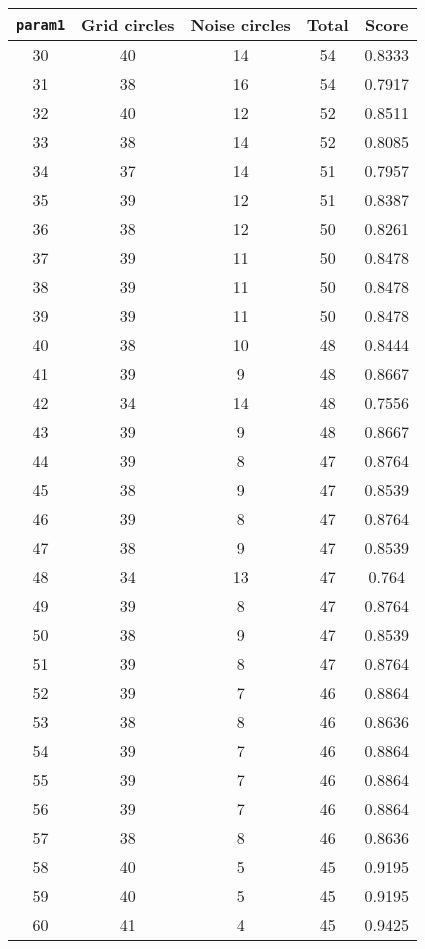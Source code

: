 \documentclass[letterpaper, 12pt]{article}
\begin{document}
\begin{longtable}{|c|c|c|c|c|}
\hline
\textbf{\texttt{param1}} & \textbf{Grid circles} & \textbf{Noise circles} & \textbf{Total} & \textbf{Score} \\
\hline
30 & 40 & 14 & 54 & 0.8333 \\
\hline
31 & 38 & 16 & 54 & 0.7917 \\
\hline
32 & 40 & 12 & 52 & 0.8511 \\
\hline
33 & 38 & 14 & 52 & 0.8085 \\
\hline
34 & 37 & 14 & 51 & 0.7957 \\
\hline
35 & 39 & 12 & 51 & 0.8387 \\
\hline
36 & 38 & 12 & 50 & 0.8261 \\
\hline
37 & 39 & 11 & 50 & 0.8478 \\
\hline
38 & 39 & 11 & 50 & 0.8478 \\
\hline
39 & 39 & 11 & 50 & 0.8478 \\
\hline
40 & 38 & 10 & 48 & 0.8444 \\
\hline
41 & 39 & 9 & 48 & 0.8667 \\
\hline
42 & 34 & 14 & 48 & 0.7556 \\
\hline
43 & 39 & 9 & 48 & 0.8667 \\
\hline
44 & 39 & 8 & 47 & 0.8764 \\
\hline
45 & 38 & 9 & 47 & 0.8539 \\
\hline
46 & 39 & 8 & 47 & 0.8764 \\
\hline
47 & 38 & 9 & 47 & 0.8539 \\
\hline
48 & 34 & 13 & 47 & 0.764 \\
\hline
49 & 39 & 8 & 47 & 0.8764 \\
\hline
50 & 38 & 9 & 47 & 0.8539 \\
\hline
51 & 39 & 8 & 47 & 0.8764 \\
\hline
52 & 39 & 7 & 46 & 0.8864 \\
\hline
53 & 38 & 8 & 46 & 0.8636 \\
\hline
54 & 39 & 7 & 46 & 0.8864 \\
\hline
55 & 39 & 7 & 46 & 0.8864 \\
\hline
56 & 39 & 7 & 46 & 0.8864 \\
\hline
57 & 38 & 8 & 46 & 0.8636 \\
\hline
58 & 40 & 5 & 45 & 0.9195 \\
\hline
59 & 40 & 5 & 45 & 0.9195 \\
\hline
60 & 41 & 4 & 45 & 0.9425 \\
\hline

\end{longtable}
\end{document}
